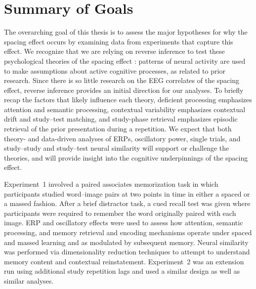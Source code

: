 
\section{Summary of Goals}


The overarching goal of this thesis is to assess the major hypotheses for why the spacing effect occurs by examining data from experiments that capture this effect.
We recognize that we are relying on reverse inference to test these psychological theories of the spacing effect \cite{Pold2006,PoldWagn2004}: patterns of neural activity are used to make assumptions about active cognitive processes, as related to prior research.  Since there is so little research on the EEG correlates of the spacing effect, reverse inference provides an initial direction for our analyses.
To briefly recap the factors that likely influence each theory, deficient processing emphasizes attention and semantic processing, contextual variability emphasizes contextual drift and study--test matching, and study-phase retrieval emphasizes episodic retrieval of the prior presentation during a repetition.
We expect that both theory- and data-driven analyses of ERPs, oscillatory power, single trials, and study--study and study--test neural similarity will support or challenge the theories, and will provide insight into the cognitive underpinnings of the spacing effect.

Experiment~1 involved a paired associates memorization task in which participants studied word--image pairs at two points in time in either a spaced or a massed fashion.  After a brief distractor task, a cued recall test was given where participants were required to remember the word originally paired with each image.
ERP and oscillatory effects were used to assess how attention, semantic processing, and memory retrieval and encoding mechanisms operate under spaced and massed learning and as modulated by subsequent memory.  Neural similarity was performed via dimensionality reduction techniques to attempt to understand memory content and contextual reinstatement.
Experiment~2 was an extension run using additional study repetition lags and used a similar design as well as similar analyses.

